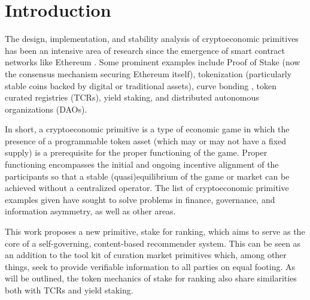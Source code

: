 \section{Introduction}

The design, implementation, and stability analysis of cryptoeconomic primitives \cite{horne2018crypto} has been an intensive area of research since the emergence of smart contract networks like Ethereum \cite{buterin2014next}. Some prominent examples include Proof of Stake \cite{quantum2011bitcoin} (now the consensus mechanism securing Ethereum itself), tokenization (particularly stable coins backed by digital or traditional assets), curve bonding \cite{graphBondingCurve}, token curated registries \cite{Goldin2018TCR} (TCRs), yield staking, and distributed autonomous organizations \cite{merkle2016daos} (DAOs). 

In short, a cryptoeconomic primitive is a type of economic game in which the presence of a programmable token asset (which may or may not have a fixed supply) is a prerequisite for the proper functioning of the game. Proper functioning encompasses the initial and ongoing incentive alignment of the participants so that a stable (quasi)equilibrium of the game or market can be achieved without a centralized operator. The list of cryptoeconomic primitive examples given have sought to solve problems in finance, governance, and information asymmetry, as well as other areas. 

This work proposes a new primitive, stake for ranking, which aims to serve as the core of a self-governing, content-based recommender system. This can be seen as an addition to the tool kit of curation market primitives which, among other things, seek to provide verifiable information to all parties on equal footing. As will be outlined, the token mechanics of stake for ranking also share similarities both with TCRs and yield staking. 